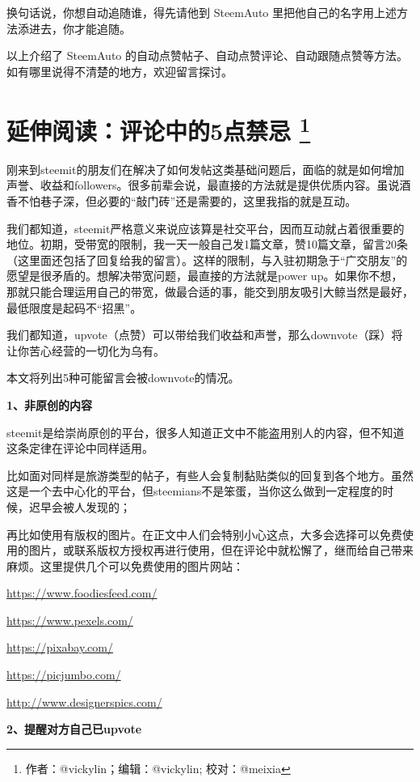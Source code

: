 \documentclass[]{ctexbook}
\begin{document}
换句话说，你想自动追随谁，得先请他到 SteemAuto 里把他自己的名字用上述方法添进去，你才能追随。

以上介绍了 SteemAuto 的自动点赞帖子、自动点赞评论、自动跟随点赞等方法。如有哪里说得不清楚的地方，欢迎留言探讨。

\hypertarget{5}{%
\section[延伸阅读：评论中的5点禁忌 ]{\texorpdfstring{延伸阅读：评论中的5点禁忌 \footnote{作者：@vickylin；编辑：@vickylin; 校对：@meixia}}{延伸阅读：评论中的5点禁忌 }}\label{5}}

刚来到steemit的朋友们在解决了如何发帖这类基础问题后，面临的就是如何增加声誉、收益和followers。很多前辈会说，最直接的方法就是提供优质内容。虽说酒香不怕巷子深，但必要的``敲门砖''还是需要的，这里我指的就是互动。

我们都知道，steemit严格意义来说应该算是社交平台，因而互动就占着很重要的地位。初期，受带宽的限制，我一天一般自己发1篇文章，赞10篇文章，留言20条（这里面还包括了回复给我的留言）。这样的限制，与入驻初期急于``广交朋友''的愿望是很矛盾的。想解决带宽问题，最直接的方法就是power up。如果你不想，那就只能合理运用自己的带宽，做最合适的事，能交到朋友吸引大鲸当然是最好，最低限度是起码不``招黑''。

我们都知道，upvote（点赞）可以带给我们收益和声誉，那么downvote（踩）将让你苦心经营的一切化为乌有。

本文将列出5种可能留言会被downvote的情况。

\textbf{1、非原创的内容}

steemit是给崇尚原创的平台，很多人知道正文中不能盗用别人的内容，但不知道这条定律在评论中同样适用。

比如面对同样是旅游类型的帖子，有些人会复制黏贴类似的回复到各个地方。虽然这是一个去中心化的平台，但steemians不是笨蛋，当你这么做到一定程度的时候，迟早会被人发现的；

再比如使用有版权的图片。在正文中人们会特别小心这点，大多会选择可以免费使用的图片，或联系版权方授权再进行使用，但在评论中就松懈了，继而给自己带来麻烦。这里提供几个可以免费使用的图片网站：

\url{https://www.foodiesfeed.com/}

\url{https://www.pexels.com/}

\url{https://pixabay.com/}

\url{https://picjumbo.com/}

\url{http://www.designerspics.com/}

\textbf{2、提醒对方自己已upvote}
\end{document}
